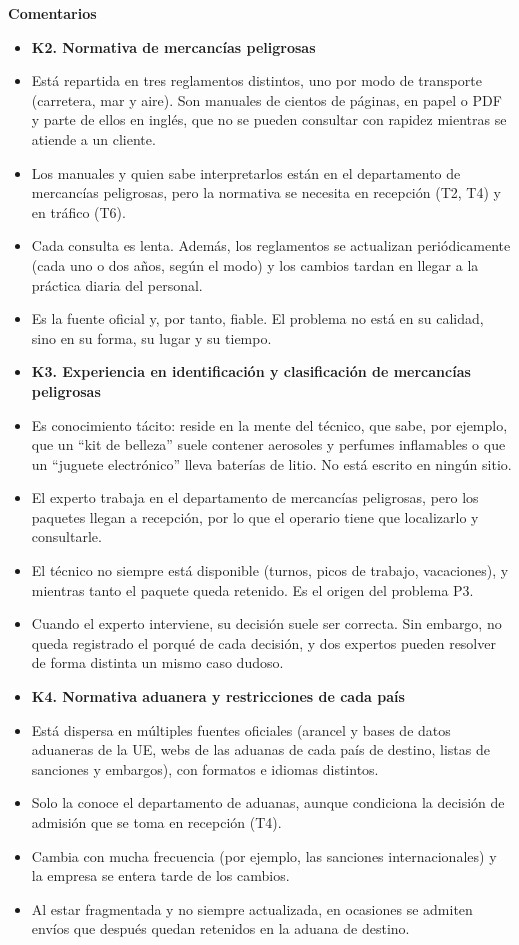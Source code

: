 \documentclass[12pt,a4paper,twoside,spanish]{article}      %
\begin{document}
\noindent\textbf{Comentarios}

{\small\setlength{\parskip}{0.1cm}
\begin{itemize}\setlength{\itemsep}{0pt}
    \item[] \textbf{K2. Normativa de mercancías peligrosas}
    \item[(1)] Está repartida en tres reglamentos distintos, uno por modo de transporte (carretera, mar y aire). Son manuales de cientos de páginas, en papel o PDF y parte de ellos en inglés, que no se pueden consultar con rapidez mientras se atiende a un cliente.
    \item[(2)] Los manuales y quien sabe interpretarlos están en el departamento de mercancías peligrosas, pero la normativa se necesita en recepción (T2, T4) y en tráfico (T6).
    \item[(3)] Cada consulta es lenta. Además, los reglamentos se actualizan periódicamente (cada uno o dos años, según el modo) y los cambios tardan en llegar a la práctica diaria del personal.
    \item[(4)] Es la fuente oficial y, por tanto, fiable. El problema no está en su calidad, sino en su forma, su lugar y su tiempo.

    \item[] \textbf{K3. Experiencia en identificación y clasificación de mercancías peligrosas}
    \item[(5)] Es conocimiento tácito: reside en la mente del técnico, que sabe, por ejemplo, que un ``kit de belleza'' suele contener aerosoles y perfumes inflamables o que un ``juguete electrónico'' lleva baterías de litio. No está escrito en ningún sitio.
    \item[(6)] El experto trabaja en el departamento de mercancías peligrosas, pero los paquetes llegan a recepción, por lo que el operario tiene que localizarlo y consultarle.
    \item[(7)] El técnico no siempre está disponible (turnos, picos de trabajo, vacaciones), y mientras tanto el paquete queda retenido. Es el origen del problema P3.
    \item[(8)] Cuando el experto interviene, su decisión suele ser correcta. Sin embargo, no queda registrado el porqué de cada decisión, y dos expertos pueden resolver de forma distinta un mismo caso dudoso.

    \item[] \textbf{K4. Normativa aduanera y restricciones de cada país}
    \item[(9)] Está dispersa en múltiples fuentes oficiales (arancel y bases de datos aduaneras de la UE, webs de las aduanas de cada país de destino, listas de sanciones y embargos), con formatos e idiomas distintos.
    \item[(10)] Solo la conoce el departamento de aduanas, aunque condiciona la decisión de admisión que se toma en recepción (T4).
    \item[(11)] Cambia con mucha frecuencia (por ejemplo, las sanciones internacionales) y la empresa se entera tarde de los cambios.
    \item[(12)] Al estar fragmentada y no siempre actualizada, en ocasiones se admiten envíos que después quedan retenidos en la aduana de destino.


\end{itemize}}
\end{document}
